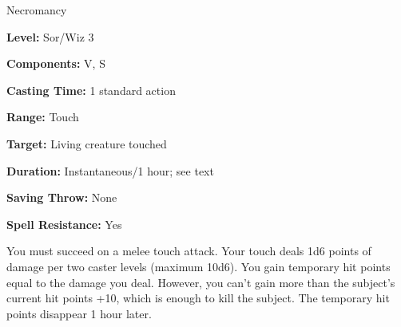 
Necromancy

\textbf{Level:} Sor/Wiz 3

\textbf{Components:} V, S

\textbf{Casting Time:} 1 standard action

\textbf{Range:} Touch

\textbf{Target:} Living creature touched

\textbf{Duration:} Instantaneous/1 hour; see text

\textbf{Saving Throw:} None

\textbf{Spell Resistance:} Yes

You must succeed on a melee touch attack. Your touch deals 1d6 points of damage 
per two caster levels (maximum 10d6). You gain temporary hit points equal to the 
damage you deal. However, you can't gain more than the subject's current hit points 
+10, which is enough to kill the subject. The temporary hit points disappear 1 
hour later.

